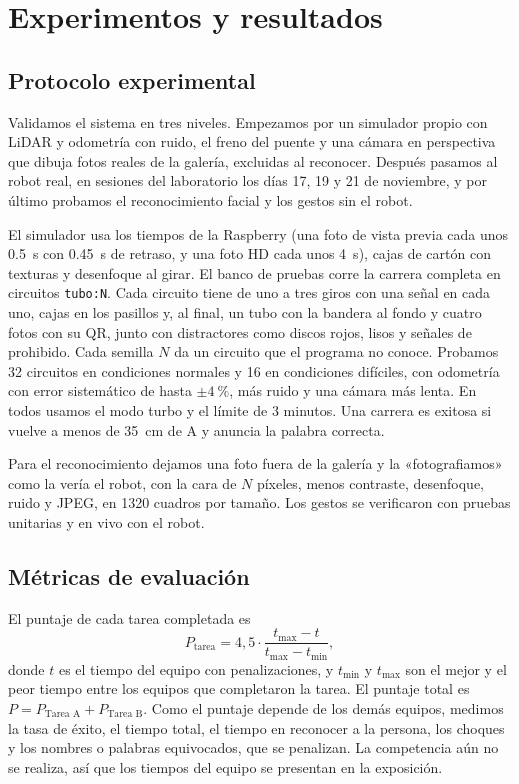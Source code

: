 \documentclass[11pt,a4paper]{article}
\begin{document}
\section{Experimentos y resultados}

\subsection{Protocolo experimental}

Validamos el sistema en tres niveles. Empezamos por un simulador propio con LiDAR y odometría con ruido, el freno del puente y una cámara en perspectiva que dibuja fotos reales de la galería, excluidas al reconocer. Después pasamos al robot real, en sesiones del laboratorio los días 17, 19 y 21 de noviembre, y por último probamos el reconocimiento facial y los gestos sin el robot.

El simulador usa los tiempos de la Raspberry (una foto de vista previa cada unos \SI{0,5}{\second} con \SI{0,45}{\second} de retraso, y una foto HD cada unos \SI{4}{\second}), cajas de cartón con texturas y desenfoque al girar. El banco de pruebas corre la carrera completa en circuitos \texttt{tubo:N}. Cada circuito tiene de uno a tres giros con una señal en cada uno, cajas en los pasillos y, al final, un tubo con la bandera al fondo y cuatro fotos con su QR, junto con distractores como discos rojos, lisos y señales de prohibido. Cada semilla $N$ da un circuito que el programa no conoce. Probamos 32 circuitos en condiciones normales y 16 en condiciones difíciles, con odometría con error sistemático de hasta $\pm\SI{4}{\percent}$, más ruido y una cámara más lenta. En todos usamos el modo turbo y el límite de 3 minutos. Una carrera es exitosa si vuelve a menos de \SI{35}{\centi\meter} de A y anuncia la palabra correcta.

Para el reconocimiento dejamos una foto fuera de la galería y la «fotografiamos» como la vería el robot, con la cara de $N$ píxeles, menos contraste, desenfoque, ruido y JPEG, en 1320 cuadros por tamaño. Los gestos se verificaron con pruebas unitarias y en vivo con el robot.

\subsection{Métricas de evaluación}

El puntaje de cada tarea completada es
\begin{equation}
  P_{\mathrm{tarea}} = 4{,}5\cdot\frac{t_{\max} - t}{t_{\max} - t_{\min}},
\end{equation}
donde $t$ es el tiempo del equipo con penalizaciones, y $t_{\min}$ y $t_{\max}$ son el mejor y el peor tiempo entre los equipos que completaron la tarea. El puntaje total es $P = P_{\text{Tarea A}} + P_{\text{Tarea B}}$. Como el puntaje depende de los demás equipos, medimos la tasa de éxito, el tiempo total, el tiempo en reconocer a la persona, los choques y los nombres o palabras equivocados, que se penalizan. La competencia aún no se realiza, así que los tiempos del equipo se presentan en la exposición.
\end{document}
